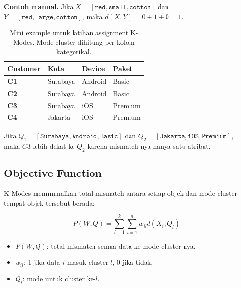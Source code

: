 \documentclass{article}
\newcommand{\code}[1]{\texttt{#1}}
\newcommand{\infobox}[2]{%
  \par\vspace{0.6em}
  \noindent\colorbox{#1}{%
    \begin{minipage}{0.96\textwidth}
    \vspace{0.65em}
    #2
    \vspace{0.65em}
    \end{minipage}}
  \par\vspace{0.8em}
}
\begin{document}
\infobox{softGreen}{\textbf{Contoh manual.} Jika $X=[\code{red},\code{small},\code{cotton}]$ dan $Y=[\code{red},\code{large},\code{cotton}]$, maka $d(X,Y)=0+1+0=1$.}
\begin{table}[H]
\centering
{}
\begin{tabularx}{0.78\textwidth}{>{\bfseries}lXXX}
\rowcolor{softGreen}
Customer & Kota & Device & Paket \\
\toprule
C1 & Surabaya & Android & Basic \\
C2 & Surabaya & Android & Basic \\
C3 & Surabaya & iOS & Premium \\
C4 & Jakarta & iOS & Premium \\
\bottomrule
\end{tabularx}
\caption{Mini example untuk latihan assignment K-Modes. Mode cluster dihitung per kolom kategorikal.}
\end{table}
\noindent Jika $Q_1=[\code{Surabaya},\code{Android},\code{Basic}]$ dan $Q_2=[\code{Jakarta},\code{iOS},\code{Premium}]$, maka $C3$ lebih dekat ke $Q_2$ karena mismatch-nya hanya satu atribut.

\subsection{Objective Function}

K-Modes meminimalkan total mismatch antara setiap objek dan mode cluster tempat objek tersebut berada:

\begin{equation}
P(W,Q) = \sum_{l=1}^{k}\sum_{i=1}^{n} w_{il} d(X_i,Q_l)
\end{equation}
\begin{itemize}[leftmargin=*]
    \item $P(W,Q)$: total mismatch semua data ke mode cluster-nya.
    \item $w_{il}$: 1 jika data $i$ masuk cluster $l$, 0 jika tidak.
    \item $Q_l$: mode untuk cluster ke-$l$.
\end{itemize}
\end{document}
